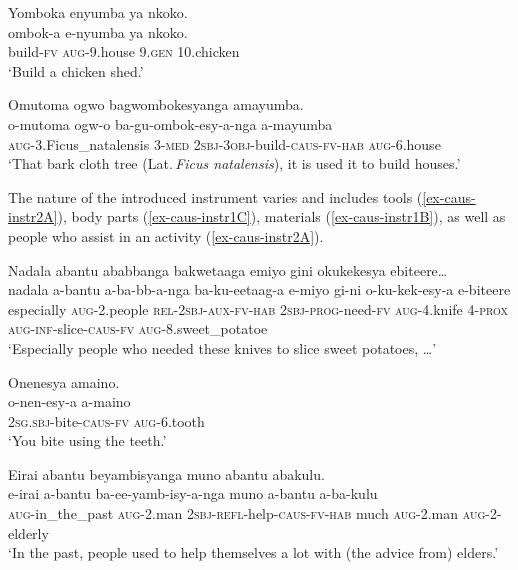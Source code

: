 \ea \label{ex-caus-instr1}
\begin{xlist}
	\ex \label{ex-caus-instr1A}
	\glll	Yomboka enyumba ya nkoko.\\
		ombok-a e-nyumba ya nkoko.\\
		build-\textsc{fv} \textsc{aug}-9.house 9.\textsc{gen} 10.chicken\\
	\glt ‘Build a chicken shed.’ 

	\ex \label{ex-caus-instr1B}
	\glll	Omutoma ogwo bagwombokesyanga amayumba.\\
		o-mutoma ogw-o ba-gu-ombok-esy-a-nga a-mayumba\\
		\textsc{aug}-3.Ficus\_natalensis 3-\textsc{med} \textsc{2sbj}-\textsc{3obj}-build-\textsc{caus}-\textsc{fv}-\textsc{hab} \textsc{aug}-6.house\\
	\glt ‘That bark cloth tree (Lat.\,\emph{Ficus natalensis}), it is used it to build houses.'
\end{xlist}
\z

\noindent The nature of the introduced instrument varies and includes tools (\ref{ex-caus-instr2A}), body parts (\ref{ex-caus-instr1C}), materials (\ref{ex-caus-instr1B}), as well as people who assist in an activity (\ref{ex-caus-instr2A}).

\ea \label{ex-caus-instr2}
\begin{xlist}
	\ex \label{ex-caus-instr2B}
	\glll Nadala abantu ababbanga bakwetaaga emiyo gini okukekesya ebiteere…\\
	  nadala a-bantu a-ba-bb-a-nga ba-ku-eetaag-a e-miyo gi-ni o-ku-kek-esy-a e-biteere\\
		especially \textsc{aug}-2.people \textsc{rel}-\textsc{2sbj}-\textsc{aux}-\textsc{fv}-\textsc{hab} \textsc{2sbj}-\textsc{prog}-need-\textsc{fv} \textsc{aug}-4.knife 4-\textsc{prox} \textsc{aug}-\textsc{inf}-slice-\textsc{caus}-\textsc{fv} \textsc{aug}-8.sweet\_potatoe\\
	\glt ‘Especially people who needed these knives to slice sweet potatoes, …'

\ex \label{ex-caus-instr1C}
	\glll	Onenesya amaino.\\
		o-nen-esy-a a-maino\\
	  2\textsc{sg.sbj}-bite-\textsc{caus}-\textsc{fv} \textsc{aug}-6.tooth\\
	\glt ‘You bite using the teeth.' 
	
\ex \label{ex-caus-instr2A}
	\glll	Eirai abantu beyambisyanga muno abantu abakulu.\\
		e-irai a-bantu ba-ee-yamb-isy-a-nga muno a-bantu a-ba-kulu\\
	 	\textsc{aug}-in\_the\_past \textsc{aug}-2.man \textsc{2sbj}-\textsc{refl}-help-\textsc{caus}-\textsc{fv}-\textsc{hab} much \textsc{aug}-2.man \textsc{aug}-2-elderly\\
	\glt ‘In the past, people used to help themselves a lot with (the advice from) elders.’ 
\end{xlist}
\z


